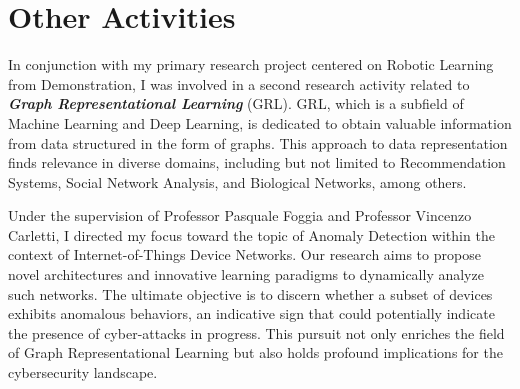 \section{Other Activities}
In conjunction with my primary research project centered on Robotic Learning from Demonstration, I was involved in a second research activity related to \textit{\textbf{Graph Representational Learning}} (GRL). GRL, which is a subfield of Machine Learning and Deep Learning, is dedicated to obtain valuable information from data structured in the form of graphs. This approach to data representation finds relevance in diverse domains, including but not limited to Recommendation Systems, Social Network Analysis, and Biological Networks, among others.

Under the supervision of Professor Pasquale Foggia and Professor Vincenzo Carletti, I directed my focus toward the topic of Anomaly Detection within the context of Internet-of-Things Device Networks. Our research aims to propose novel architectures and innovative learning paradigms to dynamically analyze such networks. The ultimate objective is to discern whether a subset of devices exhibits anomalous behaviors, an indicative sign that could potentially indicate the presence of cyber-attacks in progress. This pursuit not only enriches the field of Graph Representational Learning but also holds profound implications for the cybersecurity landscape.